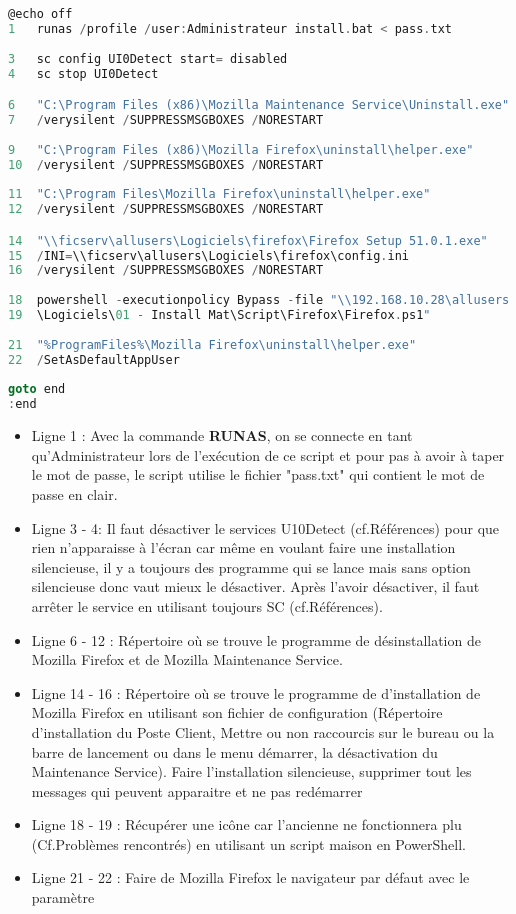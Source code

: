 \documentclass[11pt,a4paper,oneside]{article}
\begin{document}
\begin{lstlisting}[language=C]
@echo off
1	runas /profile /user:Administrateur install.bat < pass.txt
	
3	sc config UI0Detect start= disabled
4	sc stop UI0Detect

6	"C:\Program Files (x86)\Mozilla Maintenance Service\Uninstall.exe" 
7	/verysilent /SUPPRESSMSGBOXES /NORESTART
	
9	"C:\Program Files (x86)\Mozilla Firefox\uninstall\helper.exe" 
10	/verysilent /SUPPRESSMSGBOXES /NORESTART
	
11	"C:\Program Files\Mozilla Firefox\uninstall\helper.exe" 
12	/verysilent /SUPPRESSMSGBOXES /NORESTART	

14	"\\ficserv\allusers\Logiciels\firefox\Firefox Setup 51.0.1.exe" 
15	/INI=\\ficserv\allusers\Logiciels\firefox\config.ini 
16	/verysilent /SUPPRESSMSGBOXES /NORESTART
	
18	powershell -executionpolicy Bypass -file "\\192.168.10.28\allusers
19	\Logiciels\01 - Install Mat\Script\Firefox\Firefox.ps1"	
	
21	"%ProgramFiles%\Mozilla Firefox\uninstall\helper.exe" 
22	/SetAsDefaultAppUser
	
goto end
:end	
\end{lstlisting}
\begin{itemize}
	\item Ligne 1 : Avec la commande \textbf{RUNAS}, on se connecte en tant qu'Administrateur lors de l'exécution de ce script et pour pas à avoir à taper le mot de passe, le script utilise le fichier "pass.txt" qui contient le mot de passe en clair.
	\item Ligne 3 - 4: Il faut désactiver le services U10Detect (cf.Références) pour que rien n'apparaisse à l'écran car  même en voulant faire une installation silencieuse, il y a toujours des programme qui se lance mais sans option silencieuse donc vaut mieux le désactiver. Après l'avoir désactiver, il faut arrêter le service en utilisant toujours SC (cf.Références). 
	\item Ligne 6 - 12 : Répertoire où se trouve le programme de désinstallation de Mozilla Firefox et de Mozilla Maintenance Service.
	\item Ligne 14 - 16 : Répertoire où se trouve le programme de d'installation de Mozilla Firefox en utilisant son fichier de configuration (Répertoire d'installation du Poste Client, Mettre ou non raccourcis sur le bureau ou la barre de lancement ou dans le menu démarrer, la désactivation du Maintenance Service). Faire l'installation silencieuse, supprimer tout les messages qui peuvent apparaitre et ne pas redémarrer
	\item Ligne 18 - 19 : Récupérer une icône car l'ancienne ne fonctionnera plu (Cf.Problèmes rencontrés) en utilisant un script maison en PowerShell.
	\item Ligne 21 - 22 : Faire de Mozilla Firefox le navigateur par défaut avec le paramètre
\end{itemize}
\newpage
\end{document}
